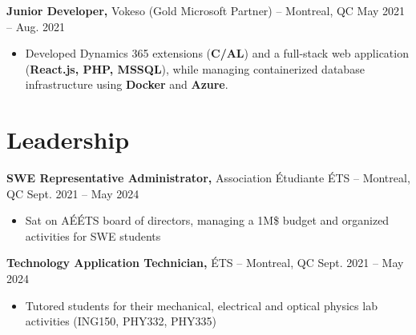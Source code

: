 \documentclass[11pt]{article}       %
\begin{document}
\textbf{Junior Developer,} {Vokeso (Gold Microsoft Partner)} -- Montreal, QC \hfill May 2021 -- Aug. 2021 \\
\vspace{-9pt}
\begin{itemize}
      \item Developed Dynamics 365 extensions (\textbf{C/AL}) and a full-stack web
            application (\textbf{React.js, PHP, MSSQL}), while managing containerized
            database infrastructure using \textbf{Docker} and \textbf{Azure}.
\end{itemize}

\vspace{-18.5pt}

\section*{Leadership}
\textbf{SWE Representative Administrator,} {Association Étudiante ÉTS} -- Montreal, QC \hfill Sept. 2021 -- May 2024 \\
\vspace{-9pt}
\begin{itemize}
      \item Sat on AÉÉTS board of directors, managing a 1M\$ budget and organized
            activities for SWE students
\end{itemize}

\textbf{Technology Application Technician,} {ÉTS} -- Montreal, QC \hfill Sept. 2021 -- May 2024 \\
\vspace{-9pt}
\begin{itemize}
      \item Tutored students for their mechanical, electrical and optical physics lab
            activities (ING150, PHY332, PHY335)
\end{itemize}


\vspace{-18.5pt}

\end{document}
